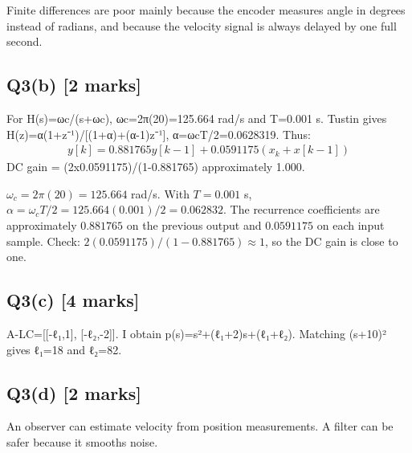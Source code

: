 \documentclass[11pt,a4paper]{article}
\begin{document}
Finite differences are poor mainly because the encoder measures angle in degrees instead of radians, and because the velocity signal is always delayed by one full second.

\subsection*{Q3(b) \hfill [2 marks]}

For H(s)=ωc/(s+ωc), ωc=2π(20)=125.664 rad/s and T=0.001 s.
Tustin gives H(z)=α(1+z⁻¹)/[(1+α)+(α-1)z⁻¹], α=ωcT/2=0.0628319.
Thus:\[\begin{aligned}y[k]=0.881765y[k-1]+0.0591175(x_k+x[k-1])\end{aligned}\]
DC gain = (2x0.0591175)/(1-0.881765) approximately 1.000.\par\smallskip $\omega_c=2\pi(20)=125.664$ rad/s. With $T=0.001$ s, $\alpha=\omega_cT/2=125.664(0.001)/2=0.062832$. The recurrence coefficients are approximately $0.881765$ on the previous output and $0.0591175$ on each input sample. Check: $2(0.0591175)/(1-0.881765)\approx1$, so the DC gain is close to one.

\subsection*{Q3(c) \hfill [4 marks]}

A-LC=[[-ℓ₁,1], [-ℓ₂,-2]].
I obtain p(s)=s²+(ℓ₁+2)s+(ℓ₁+ℓ₂).
Matching (s+10)² gives ℓ₁=18 and ℓ₂=82.

\subsection*{Q3(d) \hfill [2 marks]}

An observer can estimate velocity from position measurements.
A filter can be safer because it smooths noise.
\end{document}
